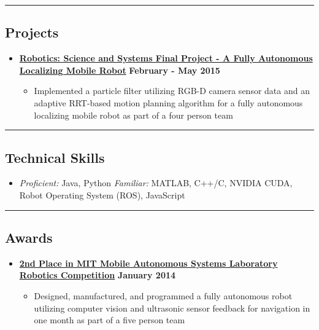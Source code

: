 \documentclass[10pt,letterpaper]{article}
\begin{document}
\hrule
\vspace{-0.6em}

\subsection*{Projects}
  \begin{itemize}
    \parskip=-0.1em
    
    \item[]
    {\href{http://courses.csail.mit.edu/rss/}{\textbf{Robotics: Science and Systems Final Project - A Fully Autonomous Localizing Mobile Robot}} \hfill
      \textbf{February - May 2015}}

    \begin{itemize}[label=\textbullet]
      \itemsep0em
      \item Implemented a particle filter utilizing RGB-D camera sensor data and an adaptive RRT-based motion planning algorithm for a fully autonomous localizing mobile robot as part of a four person team
      \end{itemize}    
\end{itemize}

\hrule
\vspace{-0.6em}

\subsection*{Technical Skills}
\begin{itemize}
	\item[]\emph{Proficient:} Java, Python \emph{Familiar:}  MATLAB, C++/C, NVIDIA CUDA, Robot Operating System (ROS), JavaScript
\end{itemize}

\hrule
\vspace{-0.6em}

\subsection*{Awards}
  \begin{itemize}
    \parskip=-0.1em
    
    \item[]
    {\href{http://maslab.mit.edu/2014/site/index.html}{\textbf{2nd Place in MIT Mobile Autonomous Systems Laboratory Robotics Competition}} \hfill
      \textbf{January 2014}}

    \begin{itemize}[label=\textbullet]
      \itemsep0em
      \item Designed, manufactured, and programmed a fully autonomous robot utilizing computer vision and ultrasonic sensor feedback for navigation in one month as part of a five person team
      \end{itemize}    
\end{itemize}
\end{document}
